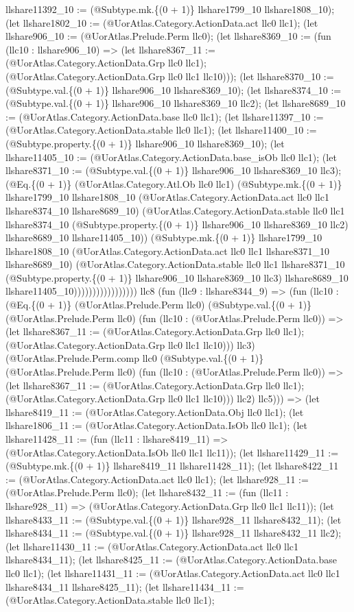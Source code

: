 \documentclass[11pt]{article}
\begin{document}
llshare11392\_10 := (@Subtype.mk.\{(0 + 1)\} llshare1799\_10 llshare1808\_10); (let llshare1802\_10 := (@UorAtlas.Category.ActionData.act llc0 llc1); (let llshare906\_10 := (@UorAtlas.Prelude.Perm llc0); (let llshare8369\_10 := (fun (llc10 : llshare906\_10) => (let llshare8367\_11 := (@UorAtlas.Category.ActionData.Grp llc0 llc1); (@UorAtlas.Category.ActionData.Grp llc0 llc1 llc10))); (let llshare8370\_10 := (@Subtype.val.\{(0 + 1)\} llshare906\_10 llshare8369\_10); (let llshare8374\_10 := (@Subtype.val.\{(0 + 1)\} llshare906\_10 llshare8369\_10 llc2); (let llshare8689\_10 := (@UorAtlas.Category.ActionData.base llc0 llc1); (let llshare11397\_10 := (@UorAtlas.Category.ActionData.stable llc0 llc1); (let llshare11400\_10 := (@Subtype.property.\{(0 + 1)\} llshare906\_10 llshare8369\_10); (let llshare11405\_10 := (@UorAtlas.Category.ActionData.base\_isOb llc0 llc1); (let llshare8371\_10 := (@Subtype.val.\{(0 + 1)\} llshare906\_10 llshare8369\_10 llc3); (@Eq.\{(0 + 1)\} (@UorAtlas.Category.Atl.Ob llc0 llc1) (@Subtype.mk.\{(0 + 1)\} llshare1799\_10 llshare1808\_10 (@UorAtlas.Category.ActionData.act llc0 llc1 llshare8374\_10 llshare8689\_10) (@UorAtlas.Category.ActionData.stable llc0 llc1 llshare8374\_10 (@Subtype.property.\{(0 + 1)\} llshare906\_10 llshare8369\_10 llc2) llshare8689\_10 llshare11405\_10)) (@Subtype.mk.\{(0 + 1)\} llshare1799\_10 llshare1808\_10 (@UorAtlas.Category.ActionData.act llc0 llc1 llshare8371\_10 llshare8689\_10) (@UorAtlas.Category.ActionData.stable llc0 llc1 llshare8371\_10 (@Subtype.property.\{(0 + 1)\} llshare906\_10 llshare8369\_10 llc3) llshare8689\_10 llshare11405\_10))))))))))))))))) llc8 (fun (llc9 : llshare8344\_9) => (fun (llc10 : (@Eq.\{(0 + 1)\} (@UorAtlas.Prelude.Perm llc0) (@Subtype.val.\{(0 + 1)\} (@UorAtlas.Prelude.Perm llc0) (fun (llc10 : (@UorAtlas.Prelude.Perm llc0)) => (let llshare8367\_11 := (@UorAtlas.Category.ActionData.Grp llc0 llc1); (@UorAtlas.Category.ActionData.Grp llc0 llc1 llc10))) llc3) (@UorAtlas.Prelude.Perm.comp llc0 (@Subtype.val.\{(0 + 1)\} (@UorAtlas.Prelude.Perm llc0) (fun (llc10 : (@UorAtlas.Prelude.Perm llc0)) => (let llshare8367\_11 := (@UorAtlas.Category.ActionData.Grp llc0 llc1); (@UorAtlas.Category.ActionData.Grp llc0 llc1 llc10))) llc2) llc5))) => (let llshare8419\_11 := (@UorAtlas.Category.ActionData.Obj llc0 llc1); (let llshare1806\_11 := (@UorAtlas.Category.ActionData.IsOb llc0 llc1); (let llshare11428\_11 := (fun (llc11 : llshare8419\_11) => (@UorAtlas.Category.ActionData.IsOb llc0 llc1 llc11)); (let llshare11429\_11 := (@Subtype.mk.\{(0 + 1)\} llshare8419\_11 llshare11428\_11); (let llshare8422\_11 := (@UorAtlas.Category.ActionData.act llc0 llc1); (let llshare928\_11 := (@UorAtlas.Prelude.Perm llc0); (let llshare8432\_11 := (fun (llc11 : llshare928\_11) => (@UorAtlas.Category.ActionData.Grp llc0 llc1 llc11)); (let llshare8433\_11 := (@Subtype.val.\{(0 + 1)\} llshare928\_11 llshare8432\_11); (let llshare8434\_11 := (@Subtype.val.\{(0 + 1)\} llshare928\_11 llshare8432\_11 llc2); (let llshare11430\_11 := (@UorAtlas.Category.ActionData.act llc0 llc1 llshare8434\_11); (let llshare8425\_11 := (@UorAtlas.Category.ActionData.base llc0 llc1); (let llshare11431\_11 := (@UorAtlas.Category.ActionData.act llc0 llc1 llshare8434\_11 llshare8425\_11); (let llshare11434\_11 := (@UorAtlas.Category.ActionData.stable llc0 llc1); 
\end{document}
